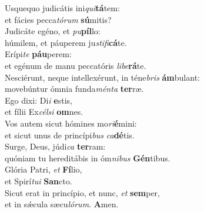 \evenverse Usquequo judicátis ini\textit{qui}\textbf{tá}tem:~\*\\
\evenverse et fácies pecca\textit{tó}\textit{rum} \textbf{sú}mitis?\\
\oddverse Judicáte egéno, et \textit{pu}\textbf{píl}lo:~\*\\
\oddverse húmilem, et páuperem ju\textit{sti}\textit{fi}\textbf{cá}te.\\
\evenverse Erípi\textit{te} \textbf{páu}perem:~\*\\
\evenverse et egénum de manu peccatóris \textit{li}\textit{be}\textbf{rá}te.\\
\oddverse Nesciérunt, neque intellexérunt, in téne\textit{bris} \textbf{ám}bulant:~\*\\
\oddverse movebúntur ómnia funda\textit{mén}\textit{ta} \textbf{ter}ræ.\\
\evenverse Ego dixi: Di\textit{i} \textbf{e}stis,~\*\\
\evenverse et fílii Ex\textit{cél}\textit{si} \textbf{om}nes.\\
\oddverse Vos autem sicut hómines mo\textit{ri}\textbf{é}mini:~\*\\
\oddverse et sicut unus de princípi\textit{bus} \textit{ca}\textbf{dé}tis.\\
\evenverse Surge, Deus, júdi\textit{ca} \textbf{ter}ram:~\*\\
\evenverse quóniam tu hereditábis in óm\textit{ni}\textit{bus} \textbf{Gén}tibus.\\
\oddverse Glória Patri, \textit{et} \textbf{Fí}lio,~\*\\
\oddverse et Spirí\textit{tu}\textit{i} \textbf{San}cto.\\
\evenverse Sicut erat in princípio, et nunc, \textit{et} \textbf{sem}per,~\*\\
\evenverse et in sǽcula sæcu\textit{ló}\textit{rum}. \textbf{A}men.\\

